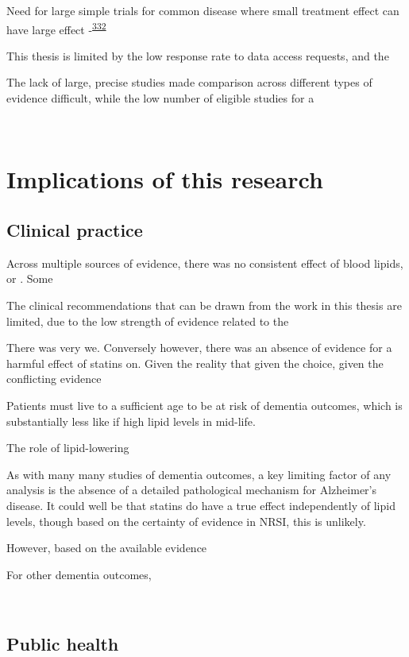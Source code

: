\documentclass[a4paper, twoside]{templates/ociamthesis}
\begin{document}
Need for large simple trials for common disease where small treatment effect can have large effect -\textsuperscript{\protect\hyperlink{ref-yusuf1984}{332}}

This thesis is limited by the low response rate to data access requests, and the

The lack of large, precise studies made comparison across different types of evidence difficult, while the low number of eligible studies for a

~

\hypertarget{implications-of-this-research}{%
\section{Implications of this research}\label{implications-of-this-research}}

\hypertarget{clinical-practice}{%
\subsection{Clinical practice}\label{clinical-practice}}

Across multiple sources of evidence, there was no consistent effect of blood lipids, or . Some

The clinical recommendations that can be drawn from the work in this thesis are limited, due to the low strength of evidence related to the

There was very we. Conversely however, there was an absence of evidence for a harmful effect of statins on. Given the reality that given the choice, given the conflicting evidence

Patients must live to a sufficient age to be at risk of dementia outcomes, which is substantially less like if high lipid levels in mid-life.

The role of lipid-lowering

As with many many studies of dementia outcomes, a key limiting factor of any analysis is the absence of a detailed pathological mechanism for Alzheimer's disease. It could well be that statins do have a true effect independently of lipid levels, though based on the certainty of evidence in NRSI, this is unlikely.

However, based on the available evidence

For other dementia outcomes,

~

\hypertarget{public-health}{%
\subsection{Public health}\label{public-health}}
\end{document}
